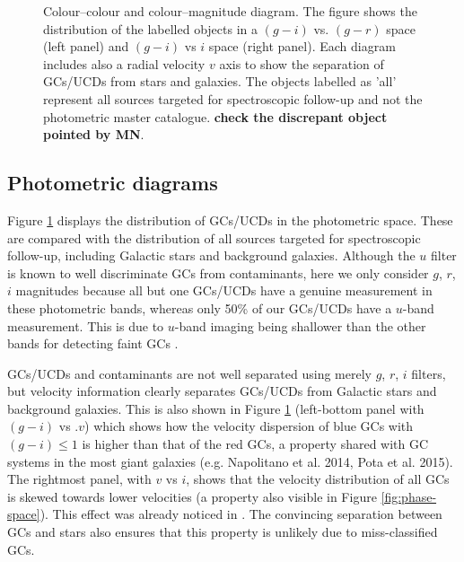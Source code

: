 \documentclass[useAMS,usenatbib]{mn2e}
\begin{document}
\begin{figure}
\caption{Colour--colour and colour--magnitude diagram. The figure shows the distribution of the labelled objects in a $(g-i)$ vs. $(g-r)$ space (left panel) and $(g-i)$ vs $i$ space (right panel). Each diagram includes also a radial velocity $v$ axis to show the separation of GCs/UCDs from stars and galaxies. The objects labelled as 'all' represent all sources targeted for spectroscopic follow-up and not the photometric master catalogue. {\bf check the discrepant object pointed by MN}. }
\label{fig:cc}
\end{figure}

\subsection{Photometric diagrams}


Figure \ref{fig:cc} displays the distribution of GCs/UCDs in the photometric space. These are compared with the distribution of all sources targeted for spectroscopic follow-up, including Galactic stars and background galaxies. Although the $u$ filter is known to well discriminate GCs from contaminants, here we only consider $g$, $r$, $i$ magnitudes because all but one GCs/UCDs have a genuine measurement in these photometric bands, whereas only 50\% of our GCs/UCDs have a $u$-band measurement. This is due to $u$-band imaging being shallower than the other bands for detecting faint GCs \citep{DAbrusco16}.

GCs/UCDs and contaminants are not well separated using merely $g$, $r$, $i$ filters, but velocity information clearly separates GCs/UCDs from Galactic stars and background galaxies. This is also shown in Figure \ref{fig:cc} (left-bottom panel with $(g-i)$ vs .$v$) which shows how the velocity dispersion of blue GCs with $(g-i) \le 1$ is higher than that of the red GCs, a property shared with GC systems in the most giant galaxies (e.g. Napolitano et al. 2014, Pota et al. 2015). The rightmost panel, with $v$ vs $i$, shows that the velocity distribution of all GCs is skewed towards lower velocities (a property also visible in Figure \ref{fig:phase-space}). This effect was already noticed in \citet{Schuberth}. The convincing separation between GCs and stars also ensures that this property is unlikely due to miss-classified GCs. 
\end{document}
